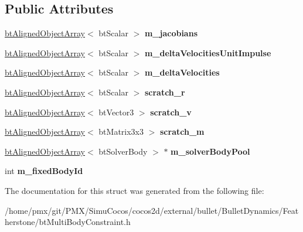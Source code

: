 \subsection*{Public Attributes}
\begin{DoxyCompactItemize}
\item 
\mbox{\label{structbtMultiBodyJacobianData_ab92f49b17b2b53b6f3bd57d3a49f57fe}} 
\hyperlink{classbtAlignedObjectArray}{bt\+Aligned\+Object\+Array}$<$ bt\+Scalar $>$ {\bfseries m\+\_\+jacobians}
\item 
\mbox{\label{structbtMultiBodyJacobianData_afff7ded36b95b6e9e4abf56f6bdad2a5}} 
\hyperlink{classbtAlignedObjectArray}{bt\+Aligned\+Object\+Array}$<$ bt\+Scalar $>$ {\bfseries m\+\_\+delta\+Velocities\+Unit\+Impulse}
\item 
\mbox{\label{structbtMultiBodyJacobianData_afc051d1b70f82e1320e3ff048fbd6c58}} 
\hyperlink{classbtAlignedObjectArray}{bt\+Aligned\+Object\+Array}$<$ bt\+Scalar $>$ {\bfseries m\+\_\+delta\+Velocities}
\item 
\mbox{\label{structbtMultiBodyJacobianData_a53dd94faf25a9a463e35a693e90ec960}} 
\hyperlink{classbtAlignedObjectArray}{bt\+Aligned\+Object\+Array}$<$ bt\+Scalar $>$ {\bfseries scratch\+\_\+r}
\item 
\mbox{\label{structbtMultiBodyJacobianData_ac221fde96144feb7b9e697bb9b8930c1}} 
\hyperlink{classbtAlignedObjectArray}{bt\+Aligned\+Object\+Array}$<$ bt\+Vector3 $>$ {\bfseries scratch\+\_\+v}
\item 
\mbox{\label{structbtMultiBodyJacobianData_ac364519d0d03699dcee68f05826c13a1}} 
\hyperlink{classbtAlignedObjectArray}{bt\+Aligned\+Object\+Array}$<$ bt\+Matrix3x3 $>$ {\bfseries scratch\+\_\+m}
\item 
\mbox{\label{structbtMultiBodyJacobianData_a1ca3375057974f366c6931d0540cf69f}} 
\hyperlink{classbtAlignedObjectArray}{bt\+Aligned\+Object\+Array}$<$ bt\+Solver\+Body $>$ $\ast$ {\bfseries m\+\_\+solver\+Body\+Pool}
\item 
\mbox{\label{structbtMultiBodyJacobianData_a547c8a3ea2363e7ca6707c2369330593}} 
int {\bfseries m\+\_\+fixed\+Body\+Id}
\end{DoxyCompactItemize}


The documentation for this struct was generated from the following file\+:\begin{DoxyCompactItemize}
\item 
/home/pmx/git/\+P\+M\+X/\+Simu\+Cocos/cocos2d/external/bullet/\+Bullet\+Dynamics/\+Featherstone/bt\+Multi\+Body\+Constraint.\+h\end{DoxyCompactItemize}
